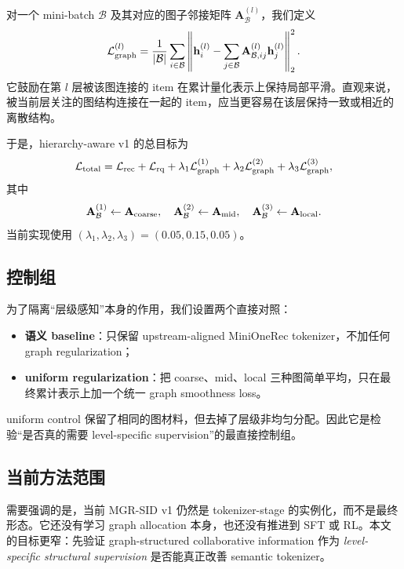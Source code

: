 对一个 mini-batch $\mathcal{B}$ 及其对应的图子邻接矩阵 $\mathbf{A}_{\mathcal{B}}^{(l)}$，我们定义
\begin{equation}
\mathcal{L}_{\mathrm{graph}}^{(l)} =
\frac{1}{|\mathcal{B}|}
\sum_{i \in \mathcal{B}}
\left\|
\mathbf{h}_i^{(l)} -
\sum_{j \in \mathcal{B}} \mathbf{A}^{(l)}_{\mathcal{B},ij} \mathbf{h}_j^{(l)}
\right\|_2^2 .
\label{eq:graph_smooth}
\end{equation}
它鼓励在第 $l$ 层被该图连接的 item 在累计量化表示上保持局部平滑。直观来说，被当前层关注的图结构连接在一起的 item，应当更容易在该层保持一致或相近的离散结构。

于是，hierarchy-aware v1 的总目标为
\begin{equation}
\mathcal{L}_{\mathrm{total}} =
\mathcal{L}_{\mathrm{rec}} + \mathcal{L}_{\mathrm{rq}}
 + \lambda_1 \mathcal{L}_{\mathrm{graph}}^{(1)}
 + \lambda_2 \mathcal{L}_{\mathrm{graph}}^{(2)}
 + \lambda_3 \mathcal{L}_{\mathrm{graph}}^{(3)},
\end{equation}
其中
\begin{equation}
\mathbf{A}^{(1)}_{\mathcal{B}} \leftarrow \mathbf{A}_{\mathrm{coarse}},\quad
\mathbf{A}^{(2)}_{\mathcal{B}} \leftarrow \mathbf{A}_{\mathrm{mid}},\quad
\mathbf{A}^{(3)}_{\mathcal{B}} \leftarrow \mathbf{A}_{\mathrm{local}} .
\end{equation}
当前实现使用 $(\lambda_1,\lambda_2,\lambda_3) = (0.05, 0.15, 0.05)$。

\subsection{控制组}

为了隔离“层级感知”本身的作用，我们设置两个直接对照：
\begin{itemize}[leftmargin=1.4em]
  \item \textbf{语义 baseline}：只保留 upstream-aligned MiniOneRec \rqvae{} tokenizer，不加任何 graph regularization；
  \item \textbf{uniform regularization}：把 coarse、mid、local 三种图简单平均，只在最终累计表示上加一个统一 graph smoothness loss。
\end{itemize}

uniform control 保留了相同的图材料，但去掉了层级非均匀分配。因此它是检验“是否真的需要 level-specific supervision”的最直接控制组。

\subsection{当前方法范围}

需要强调的是，当前 MGR-SID v1 仍然是 tokenizer-stage 的实例化，而不是最终形态。它还没有学习 graph allocation 本身，也还没有推进到 SFT 或 RL。本文的目标更窄：先验证 graph-structured collaborative information 作为 \emph{level-specific structural supervision} 是否能真正改善 semantic tokenizer。
